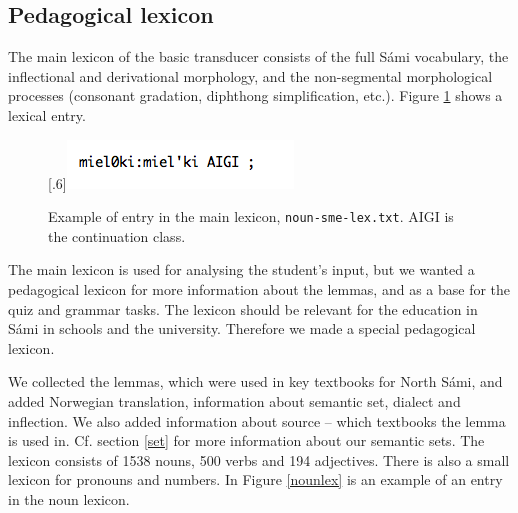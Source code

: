 \documentclass[11pt]{article}
\begin{document}
\subsection{Pedagogical lexicon}

The main lexicon of the basic transducer consists of the full Sámi vocabulary, the inflectional and derivational morphology, and the non-segmental morphological processes (consonant gradation, diphthong simplification, etc.). Figure \ref{nounsmelex} shows a lexical entry.

\begin{figure}[htbp]
\begin{center}
\scalebox{.6}[.6]{\includegraphics{presentation/img/noun-sme-lex.png}}\\
\caption{Example of entry in the main lexicon, \texttt{noun-sme-lex.txt}. AIGI is the continuation class.}
\label{nounsmelex}
\end{center}
\end{figure}

The main lexicon is used for analysing the student's input, but we wanted a pedagogical lexicon for more information about the lemmas, and as a base for the quiz and grammar tasks. The lexicon should be relevant for the education in Sámi in schools and the university. Therefore we made a special pedagogical lexicon.

We collected the lemmas, which were used in key textbooks for North Sámi, and added Norwegian translation, information about semantic set, dialect and inflection. We also added information about source -- which textbooks the lemma is used in. Cf. section \ref{set} for more information about our semantic sets. The lexicon consists of 1538 nouns, 500 verbs and 194 adjectives. There is also a small lexicon for pronouns and numbers. In Figure \ref{nounlex} is an example of an entry in the noun lexicon. \\
\end{document}
